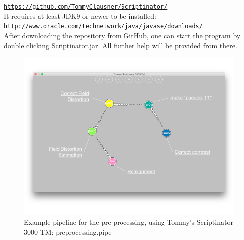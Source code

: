\documentclass[12pt,a4paper]{scrartcl}
\begin{document}
\href{https://github.com/TommyClausner/Scriptinator/}{\nolinkurl{https://github.com/TommyClausner/Scriptinator/}}\\

\noindent It requires at least JDK9 or newer to be installed:\\

\href{http://www.oracle.com/technetwork/java/javase/downloads/}{\nolinkurl{http://www.oracle.com/technetwork/java/javase/downloads/}}\\

\noindent After downloading the repository from GitHub, one can start the program by double clicking Scriptinator.jar. All further help will be provided from there.


\begin{figure}[h]
\begin{center}
\includegraphics[width=\textwidth]{preproc-pipe}
\caption[Pre-processing Pipeline]{Example pipeline for the pre-processing, using Tommy's Scriptinator 3000 TM: preprocessing.pipe}
\end{center}
\end{figure}
\end{document}

